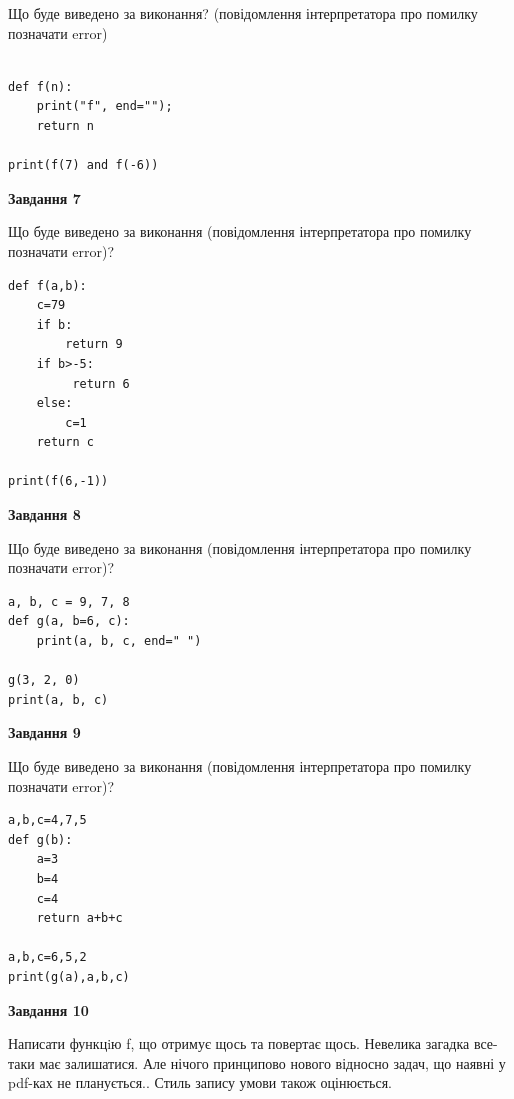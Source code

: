 \documentclass[12pt, ukrainian]{article}
\begin{document}
{\begin {large}
Що буде виведено за виконання? (повідомлення інтерпретатора про помилку позначати error)\par
\begin{verbatim}

def f(n):
    print("f", end="");
    return n

print(f(7) and f(-6))
\end{verbatim}

{\begin {center}\textbf{Завдання 7}\end {center}}

Що буде виведено за виконання (повідомлення інтерпретатора про помилку позначати error)?\par
\begin{verbatim}
def f(a,b):
    c=79
    if b:
        return 9
    if b>-5:
         return 6
    else: 
        c=1
    return c

print(f(6,-1))
\end{verbatim}

{\begin {center}\textbf{Завдання 8}\end {center}}

Що буде виведено за виконання (повідомлення інтерпретатора про помилку позначати error)?\par
\begin{verbatim}
a, b, c = 9, 7, 8
def g(a, b=6, c):
    print(a, b, c, end=" ")

g(3, 2, 0)
print(a, b, c)
\end{verbatim}

{\begin {center}\textbf{Завдання 9}\end {center}}

Що буде виведено за виконання (повідомлення інтерпретатора про помилку позначати error)?\par
\begin{verbatim}
a,b,c=4,7,5
def g(b):
    a=3
    b=4
    c=4
    return a+b+c

a,b,c=6,5,2
print(g(a),a,b,c)
\end{verbatim}

{\begin {center}\textbf{Завдання 10}\end {center}}


Написати функцiю f, що отримує щось та повертає щось. Невелика загадка все-таки має залишатися. Але нічого принципово нового відносно задач, що наявні у pdf-ках не планується.. Стиль запису умови також оцінюється.\par
\end {large}}
\newpage
\end{document}
